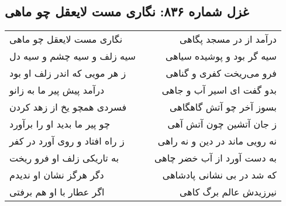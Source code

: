 \begin{center}
\section*{غزل شماره ۸۳۶: نگاری مست لایعقل چو ماهی}
\label{sec:836}
\begin{longtable}{l p{0.5cm} r}
نگاری مست لایعقل چو ماهی
&&
درآمد از در مسجد پگاهی
\\
سیه زلف و سیه چشم و سیه دل
&&
سیه گر بود و پوشیده سیاهی
\\
ز هر مویی که اندر زلف او بود
&&
فرو می‌ریخت کفری و گناهی
\\
درآمد پیش پیر ما به زانو
&&
بدو گفت ای اسیر آب و جاهی
\\
فسردی همچو یخ از زهد کردن
&&
بسوز آخر چو آتش گاهگاهی
\\
چو پیر ما بدید او را برآورد
&&
ز جان آتشین چون آتش آهی
\\
ز راه افتاد و روی آورد در کفر
&&
نه رویی ماند در دین و نه راهی
\\
به تاریکی زلف او فرو ریخت
&&
به دست آورد از آب خضر چاهی
\\
دگر هرگز نشان او ندیدم
&&
که شد در بی نشانی پادشاهی
\\
اگر عطار با او هم برفتی
&&
نیرزیدش عالم برگ کاهی
\\
\end{longtable}
\end{center}
